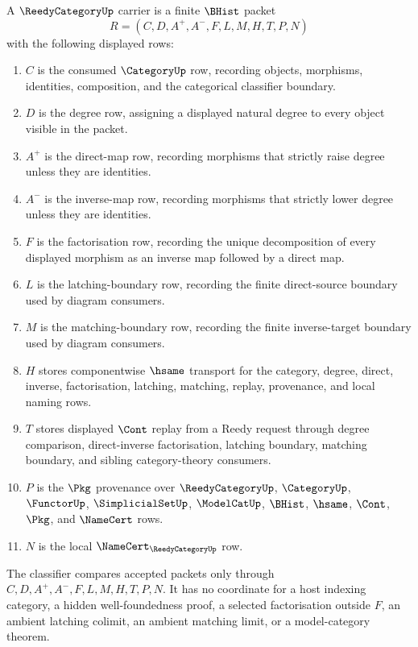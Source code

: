 \begin{definition}
\label{def:reedy-category-carrier}
A $\ReedyCategoryUp$ carrier is a finite $\BHist$ packet
$$
R=(C,D,A^{+},A^{-},F,L,M,H,T,P,N)
$$
with the following displayed rows:
\begin{enumerate}
\item $C$ is the consumed $\CategoryUp$ row, recording objects, morphisms, identities, composition, and the categorical classifier boundary.
\item $D$ is the degree row, assigning a displayed natural degree to every object visible in the packet.
\item $A^{+}$ is the direct-map row, recording morphisms that strictly raise degree unless they are identities.
\item $A^{-}$ is the inverse-map row, recording morphisms that strictly lower degree unless they are identities.
\item $F$ is the factorisation row, recording the unique decomposition of every displayed morphism as an inverse map followed by a direct map.
\item $L$ is the latching-boundary row, recording the finite direct-source boundary used by diagram consumers.
\item $M$ is the matching-boundary row, recording the finite inverse-target boundary used by diagram consumers.
\item $H$ stores componentwise $\hsame$ transport for the category, degree, direct, inverse, factorisation, latching, matching, replay, provenance, and local naming rows.
\item $T$ stores displayed $\Cont$ replay from a Reedy request through degree comparison, direct-inverse factorisation, latching boundary, matching boundary, and sibling category-theory consumers.
\item $P$ is the $\Pkg$ provenance over $\ReedyCategoryUp$, $\CategoryUp$, $\FunctorUp$, $\SimplicialSetUp$, $\ModelCatUp$, $\BHist$, $\hsame$, $\Cont$, $\Pkg$, and $\NameCert$ rows.
\item $N$ is the local $\NameCert_{\ReedyCategoryUp}$ row.
\end{enumerate}
The classifier compares accepted packets only through $C,D,A^{+},A^{-},F,L,M,H,T,P,N$. It has no coordinate for a host indexing category, a hidden well-foundedness proof, a selected factorisation outside $F$, an ambient latching colimit, an ambient matching limit, or a model-category theorem.
\end{definition}

